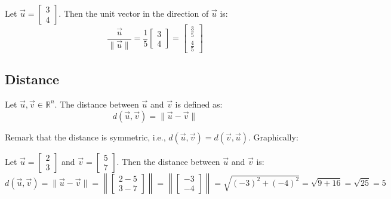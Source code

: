 \begin{eg}
    Let $\vec{u} = \begin{bmatrix}
        3 \\ 4
    \end{bmatrix}$. Then the unit vector in the direction of $\vec{u}$ is:
    \[
        \frac{\vec{u}}{\|\vec{u}\|} = \frac{1}{5} \begin{bmatrix}
            3 \\ 4
        \end{bmatrix} = \begin{bmatrix}
            \frac{3}{5} \\ \frac{4}{5}
        \end{bmatrix}
    \]
\end{eg}

\subsection{Distance}
\begin{definition}[Distance]
    Let $\vec{u}, \vec{v} \in \mathbb{R}^n$. The distance between $\vec{u}$ and $\vec{v}$ is defined as:
    \[
        d(\vec{u}, \vec{v}) = \|\vec{u} - \vec{v}\|
    \]
\end{definition}
Remark that the distance is symmetric, i.e., $d(\vec{u}, \vec{v}) = d(\vec{v}, \vec{u})$. Graphically:
\begin{center}
\end{center}

\begin{eg}
    Let $\vec{u} = \begin{bmatrix}
        2 \\ 3
    \end{bmatrix}$ and $\vec{v} = \begin{bmatrix}
        5 \\ 7
    \end{bmatrix}$. Then the distance between $\vec{u}$ and $\vec{v}$ is:
    \[
        d(\vec{u}, \vec{v}) = \|\vec{u} - \vec{v}\| = \left\| \begin{bmatrix}
            2 - 5 \\ 3 - 7
        \end{bmatrix} \right\| = \left\| \begin{bmatrix}
            -3 \\ -4
        \end{bmatrix} \right\| = \sqrt{(-3)^2 + (-4)^2} = \sqrt{9 + 16} = \sqrt{25} = 5
    \]
\end{eg}

